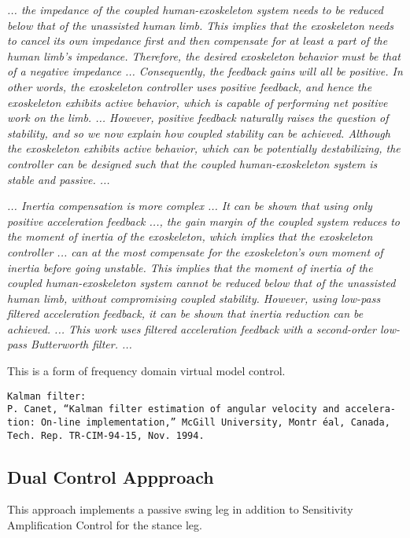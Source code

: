 \documentclass[letterpaper,12pt,fullpage]{article}
\begin{document}
{\it ... the impedance of the coupled human-exoskeleton
system needs to be reduced below that of the unassisted
human limb. This implies that the exoskeleton needs to
cancel its own impedance first and then compensate for
at least a part of the human limb’s impedance. Therefore,
the desired exoskeleton behavior must be that of a negative
impedance ... Consequently,
the feedback gains will all be
positive. In other words, the exoskeleton controller uses
positive feedback, and hence the exoskeleton exhibits active
behavior, which is capable of performing net positive work
on the limb. ...
However, positive feedback naturally raises the question of
stability, and so we now explain how coupled stability can be
achieved. Although the exoskeleton exhibits active behavior,
which can be potentially destabilizing, the controller can be
designed such that the coupled human-exoskeleton system
is stable and passive. ... 
}~\cite{Nagarajan_etal_2015}

{\it
... Inertia compensation is more complex ...
It can be shown that using only positive acceleration
feedback ..., the gain margin of the coupled system
reduces to the moment of inertia of the exoskeleton, which
implies that the exoskeleton controller ... can at the most
compensate for the exoskeleton’s own moment of inertia
before going unstable. This implies that the moment of
inertia of the coupled human-exoskeleton system cannot be
reduced below that of the unassisted human limb, without
compromising coupled stability. However, using low-pass
filtered acceleration feedback, it can be shown that inertia 
reduction can be achieved. ...
This work uses filtered acceleration
feedback with a second-order low-pass Butterworth filter. ...
}~\cite{Nagarajan_etal_2015}

This is a form of frequency domain virtual model control.

\begin{verbatim}
Kalman filter:
P. Canet, “Kalman filter estimation of angular velocity and accelera-
tion: On-line implementation,” McGill University, Montr ́eal, Canada,
Tech. Rep. TR-CIM-94-15, Nov. 1994.
\end{verbatim}

\subsection{Dual Control Appproach}

This approach implements a passive swing leg in addition to Sensitivity 
Amplification Control for the stance leg.
\end{document}
